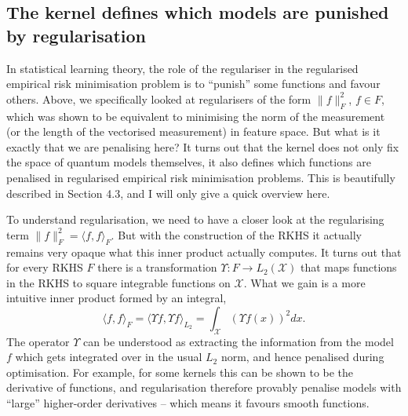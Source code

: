 \documentclass[aps, reprint, onecolumn, nofootinbib, longbibliography]{revtex4-2}
\begin{document}
\subsection{The kernel defines which models are punished by regularisation}\label{ssec:regularisation}

In statistical learning theory, the role of the regulariser in the regularised empirical risk minimisation problem is to ``punish'' some functions and favour others. Above, we specifically looked at regularisers of the form $\|f\|^2_{F}$, $f \in F$, which was shown to be equivalent to minimising the norm of the measurement (or the length of the vectorised measurement) in feature space. But what is it exactly that we are penalising here? It turns out that the kernel does not only fix the space of quantum models themselves, it also defines which functions are penalised in regularised empirical risk minimisation problems. This is beautifully described in \cite{scholkopf2002learning} Section 4.3, and I will only give a quick overview here. 

To understand regularisation, we need to have a closer look at the regularising term $\|f\|^2_{F} = \langle f, f \rangle_{F} $. But with the construction of the RKHS it actually remains very opaque what this inner product actually computes. It turns out that for every RKHS $F$ there is a transformation $\Upsilon: F \rightarrow L_2(\mathcal{X})$ that maps functions in the RKHS to square integrable functions on $\mathcal{X}$. What we gain is a more intuitive inner product formed by an integral,
\begin{equation}
    \langle f, f \rangle_{F} = \langle \Upsilon f, \Upsilon f \rangle_{L_2} = \int_{\mathcal{X}} (\Upsilon f(x))^2 dx. 
\end{equation}
The operator $\Upsilon$ can be understood as extracting the information from the model $f$ which gets integrated over in the usual $L_2$ norm, and hence penalised during optimisation. For example, for some kernels this can be shown to be the derivative of functions, and regularisation therefore provably penalise models with ``large'' higher-order derivatives -- which means it favours smooth functions. 
\end{document}
